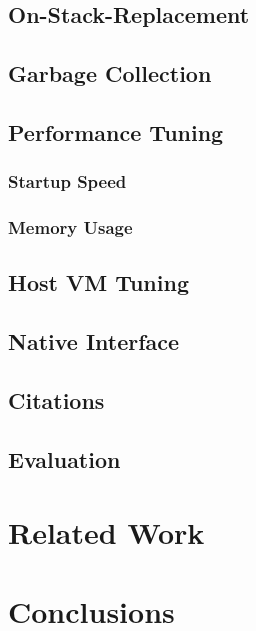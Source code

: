 \documentclass{acm_proc_article-sp}
\begin{document}
\subsection{On-Stack-Replacement}

\subsection{Garbage Collection}

\subsection{Performance Tuning}

\subsubsection{Startup Speed}

\subsubsection{Memory Usage}

\subsection{Host VM Tuning}

\subsection{Native Interface}

\subsection{Citations}

\subsection{Evaluation}

\section{Related Work}

\section{Conclusions}


\end{document}
